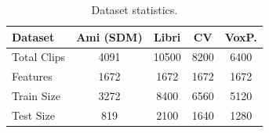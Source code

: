 \begin{table}[t]
    \centering
    \caption{Dataset statistics.}
    \label{tab:dataset_stats} \small
    \begin{tabular}{lcccc}
        \toprule \textbf{Dataset} & Ami (SDM)  & Libri & CV   & VoxP.\\
        \midrule Total Clips      & 4091 & 10500 & 8200 & 6400  \\
        Features                  & 1672 & 1672  & 1672 & 1672  \\
        Train Size                & 3272 & 8400  & 6560 & 5120  \\
        Test Size                 & 819  & 2100  & 1640 & 1280  \\
        \bottomrule
    \end{tabular}
\end{table}